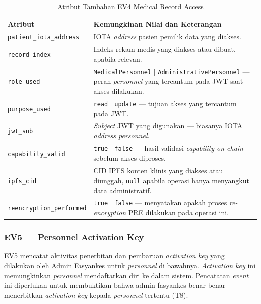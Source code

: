 \begin{table}[htbp]
\centering
\caption{Atribut Tambahan EV4 Medical Record Access}
\label{tab:ev4-detail}
\renewcommand{\arraystretch}{1.3}
\begin{tabular}{|p{4cm}|p{7.5cm}|}
\hline
\textbf{Atribut} & \textbf{Kemungkinan Nilai dan Keterangan} \\
\hline
\texttt{patient\_iota\_address} &
IOTA \textit{address} pasien pemilik data yang diakses. \\
\hline
\texttt{record\_index} &
Indeks rekam medis yang diakses atau dibuat, apabila relevan. \\
\hline
\texttt{role\_used} &
\texttt{MedicalPersonnel} | \texttt{AdministrativePersonnel} --- peran
\textit{personnel} yang tercantum pada JWT saat akses dilakukan. \\
\hline
\texttt{purpose\_used} &
\texttt{read} | \texttt{update} --- tujuan akses yang tercantum pada JWT. \\
\hline
\texttt{jwt\_sub} &
\textit{Subject} JWT yang digunakan --- biasanya IOTA \textit{address
personnel}. \\
\hline
\texttt{capability\_valid} &
\texttt{true} | \texttt{false} --- hasil validasi \textit{capability
on-chain} sebelum akses diproses. \\
\hline
\texttt{ipfs\_cid} &
CID IPFS konten klinis yang diakses atau diunggah, \texttt{null} apabila
operasi hanya menyangkut data administratif. \\
\hline
\texttt{reencryption\_performed} &
\texttt{true} | \texttt{false} --- menyatakan apakah proses
\textit{re-encryption} PRE dilakukan pada operasi ini. \\
\hline
\end{tabular}
\end{table}

\subsubsection{EV5 --- Personnel Activation Key}
\label{subsec:ev5-personnel-activation-key}

EV5 mencatat aktivitas penerbitan dan pembaruan \textit{activation key} yang
dilakukan oleh Admin Fasyankes untuk \textit{personnel} di bawahnya.
\textit{Activation key} ini memungkinkan \textit{personnel} mendaftarkan diri
ke dalam sistem. Pencatatan \textit{event} ini diperlukan untuk membuktikan
bahwa admin fasyankes benar-benar menerbitkan \textit{activation key} kepada
\textit{personnel} tertentu (T8).

